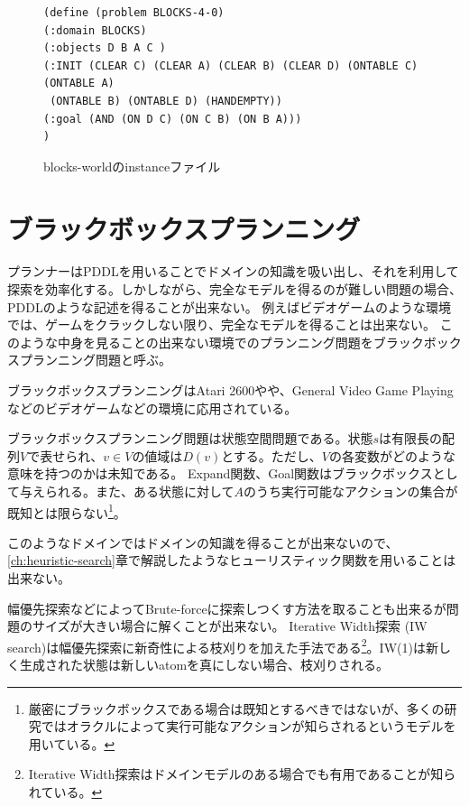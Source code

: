 \documentclass{report}
\begin{document}
\begin{figure}
\begin{adjustbox}{width=\textwidth,keepaspectratio}
\lstset{language=pddl}
\begin{lstlisting}
(define (problem BLOCKS-4-0)
(:domain BLOCKS)
(:objects D B A C )
(:INIT (CLEAR C) (CLEAR A) (CLEAR B) (CLEAR D) (ONTABLE C) (ONTABLE A)
 (ONTABLE B) (ONTABLE D) (HANDEMPTY))
(:goal (AND (ON D C) (ON C B) (ON B A)))
)

\end{lstlisting}
\end{adjustbox}
\caption{blocks-worldのinstanceファイル}
\label{fig:pddl-instance}
\end{figure}

\section{ブラックボックスプランニング}

プランナーはPDDLを用いることでドメインの知識を吸い出し、それを利用して探索を効率化する。しかしながら、完全なモデルを得るのが難しい問題の場合、PDDLのような記述を得ることが出来ない。
例えばビデオゲームのような環境では、ゲームをクラックしない限り、完全なモデルを得ることは出来ない。
このような中身を見ることの出来ない環境でのプランニング問題をブラックボックスプランニング問題と呼ぶ。

ブラックボックスプランニングはAtari 2600や\cite{lipovetzky2015a}や、General Video Game Playing \cite{geffner2015}などのビデオゲームなどの環境に応用されている。

ブラックボックスプランニング問題は状態空間問題である。状態$s$は有限長の配列$V$で表せられ、$v \in V$の値域は$D(v)$とする。ただし、$V$の各変数がどのような意味を持つのかは未知である。
Expand関数、Goal関数はブラックボックスとして与えられる。また、ある状態に対して$A$のうち実行可能なアクションの集合が既知とは限らない\footnote{厳密にブラックボックスである場合は既知とするべきではないが、多くの研究ではオラクルによって実行可能なアクションが知らされるというモデルを用いている。}。

このようなドメインではドメインの知識を得ることが出来ないので、\ref{ch:heuristic-search}章で解説したようなヒューリスティック関数を用いることは出来ない。

幅優先探索などによってBrute-forceに探索しつくす方法を取ることも出来るが問題のサイズが大きい場合に解くことが出来ない\cite{Bellemare2013}。
Iterative Width探索 (IW search)\cite{lipovetzky2015a}は幅優先探索に新奇性による枝刈りを加えた手法である\footnote{Iterative Width探索はドメインモデルのある場合でも有用であることが知られている\cite{lipovetzkyg12}。}。IW(1)は新しく生成された状態は新しいatomを真にしない場合、枝刈りされる。
\end{document}
